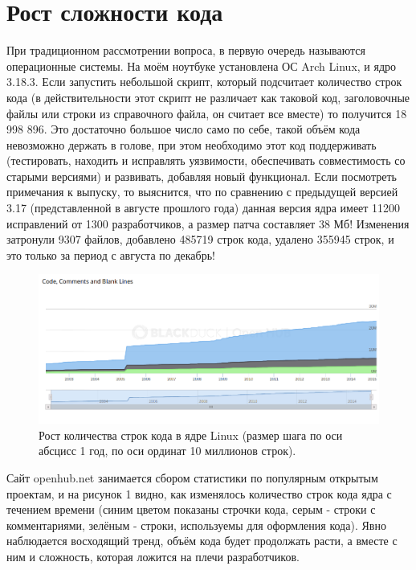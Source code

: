 \documentclass[a4paper, 12pt]{article} %
\begin{document}

\section*{Рост сложности кода}

При традиционном рассмотрении вопроса, в первую очередь называются операционные системы. На моём ноутбуке установлена ОС Arch Linux, и ядро 3.18.3. Если запустить небольшой скрипт, который подсчитает количество строк кода (в действительности этот скрипт не различает как таковой код, заголовочные файлы или строки из справочного файла, он считает все вместе) то получится 18 998 896. Это достаточно большое число само по себе, такой объём кода невозможно держать в голове, при этом необходимо этот код поддерживать (тестировать, находить и исправлять уязвимости, обеспечивать совместимость со старыми версиями) и развивать, добавляя новый функционал. Если посмотреть примечания к выпуску, то выяснится, что по сравнению с предыдущей версией 3.17 (представленной в августе прошлого года) данная версия ядра имеет 11200 исправлений от 1300 разработчиков, а размер патча составляет 38 Мб! Изменения затронули 9307 файлов, добавлено 485719 строк кода, удалено 355945 строк, и это только за период с августа по декабрь!

\begin{figure}[h!]
\centering
\includegraphics[scale=0.4]{res/pic001}
\caption{Рост количества строк кода в ядре Linux (размер шага по оси абсцисс 1 год, по оси ординат 10 миллионов строк).}
\end{figure}

Сайт openhub.net занимается сбором статистики по популярным открытым проектам, и на рисунок 1 видно, как изменялось количество строк кода ядра с течением времени (синим цветом показаны строчки кода, серым - строки с комментариями, зелёным - строки, используемы для оформления кода). Явно наблюдается восходящий тренд, объём кода будет продолжать расти, а вместе с ним и сложность, которая ложится на плечи разработчиков.
\end{document}
